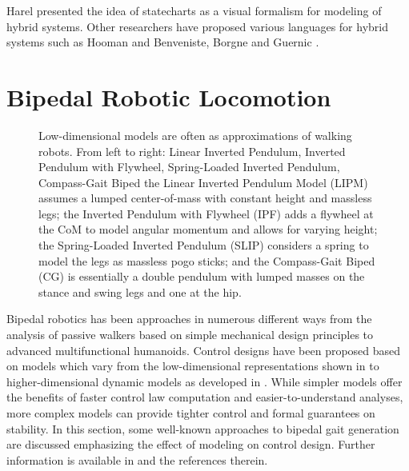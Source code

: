 Harel \cite{Harel1987} presented the idea of statecharts as a visual formalism
for modeling of hybrid systems.
%
Other researchers have proposed various languages for hybrid systems such as
Hooman \cite{Hooman1993} and Benveniste, Borgne and Guernic \cite{Benveniste1993}.




\section{Bipedal Robotic Locomotion} \label{sec:literature-bipeds}

\begin{figure}
  \centering
  \def\svgwidth{1.0\columnwidth}
  
  \caption[Four low-dimensional models]{%
    Low-dimensional models are often as approximations of walking robots.
    From left to right:
    Linear Inverted Pendulum, Inverted Pendulum with Flywheel, Spring-Loaded
    Inverted Pendulum, Compass-Gait Biped
    the Linear Inverted Pendulum Model (LIPM) assumes a lumped center-of-mass
    with constant height and massless legs;
    the Inverted Pendulum with Flywheel (IPF) adds a flywheel at the CoM to
    model angular momentum and allows for varying height;
    the Spring-Loaded Inverted Pendulum (SLIP) considers a spring to model the
    legs as massless pogo sticks;
    and the Compass-Gait Biped (CG) is essentially a double pendulum with
    lumped masses on the stance and swing legs and one at the hip.}
  \label{fig:biped-models}
\end{figure}

Bipedal robotics has been approaches in numerous different ways from the
analysis of passive walkers based on simple mechanical design principles to
advanced multifunctional humanoids.
%
Control designs have been proposed based on models which vary from the
low-dimensional representations shown in  to
higher-dimensional dynamic models as developed in .
%
While simpler models offer the benefits of faster control law computation and
easier-to-understand analyses, more complex models can provide tighter control
and formal guarantees on stability.
%
In this section, some well-known approaches to bipedal gait generation
are discussed emphasizing the effect of modeling on control design.
%
Further information is available in \cite{Chevallereau2009, Full1999,
  Holmes2006, Hurmuzlu2004, Kuo2007, Sadati2012, Siciliano2008, Westervelt2007,
  Wisse2007} and the references therein.


